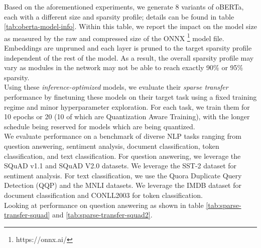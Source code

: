 Based on the aforementioned experiments, we generate 8 variants of oBERTa, each with a different size and sparsity profile; details can be found in table \ref{tab:oberta-model-info}. Within this table, we report the impact on the model size as measured by the raw and compressed size of the ONNX \footnote{https://onnx.ai/} model file. Embeddings are unpruned and each layer is pruned to the target sparsity profile independent of the rest of the model. As a result, the overall sparsity profile may vary as modules in the network may not be able to reach exactly 90\% or 95\% sparsity. \\
Using these \textit {inference-optimized} models, we evaluate their \textit{sparse transfer} performance by finetuning these models on their target task using a fixed training regime and minor hyperparameter exploration. For each task, we train them for 10 epochs or 20 (10 of which are Quantization Aware Training), with the longer schedule being reserved for models which are being quantized.  \\
We evaluate performance on a benchmark of diverse NLP tasks ranging from question answering, sentiment analysis, document classification, token classification, and text classification. For question answering, we leverage the SQuAD v1.1 \cite{Rajpurkar2016SQuAD10} and SQuAD V2.0 \cite{Rajpurkar2018KnowWY} datasets. We leverage the SST-2 \cite{socher-etal-2013-recursive} dataset for sentiment analysis. For text classification, we use the Quora Duplicate Query Detection (QQP) \cite{sambitsekhar_2017} and the MNLI \cite{N18-1101} datasets. We leverage the IMDB \cite{maas-EtAl:2011:ACL-HLT2011} dataset for document classification and CONLL2003 \cite{tjong-kim-sang-de-meulder-2003-introduction} for token classification.\\ 
Looking at performance on question answering as shown in table \ref{tab:sparse-transfer-squad} and \ref{tab:sparse-transfer-squad2}.
